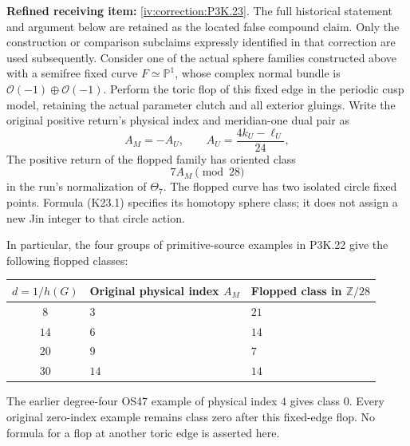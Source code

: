 \begin{theorem}\hypertarget{tag-02U3}{}\label{night:P3K.23}

\par\noindent\textbf{Refined receiving item:} \cref{iv:correction:P3K.23}. The full historical statement and argument below are retained as the located false compound claim. Only the construction or comparison subclaims expressly identified in that correction are used subsequently.
Consider one of the actual sphere families constructed above with a
semifree fixed curve \(F\simeq\mathbb P^1\), whose complex normal bundle
is \(\mathcal O(-1)\oplus\mathcal O(-1)\). Perform the toric flop of
this fixed edge in the periodic cusp model, retaining the actual
parameter clutch and all exterior gluings. Write the original positive
return's physical index and meridian-one dual pair as
\[
             A_M=-A_U,\qquad A_U=\frac{4k_U-\ell_U}{24},
\]
The positive return of the flopped family has oriented class
\[
                         7A_M\pmod {28}                 \tag{K23.1}
\]
in the run's normalization of \(\Theta _7\). The flopped curve has two
isolated circle fixed points. Formula (K23.1) specifies its homotopy
sphere class; it does not assign a new Jin integer to that circle
action.

In particular, the four groups of primitive-source examples in
P3K.22 give the following flopped classes:


\begin{center}\small\begin{tabular}{c l l}\hline
\(d=1/h(G)\) & Original physical index \(A_M\) & Flopped class in \(\mathbb Z/28\) \\
\hline
\(8\) & \(3\) & \(21\) \\
\(14\) & \(6\) & \(14\) \\
\(20\) & \(9\) & \(7\) \\
\(30\) & \(14\) & \(14\) \\
\hline\end{tabular}\end{center}

The earlier degree-four OS47 example of physical index \(4\) gives class
\(0\). Every original zero-index example remains class zero after
this fixed-edge flop. No formula for a flop at another toric edge is
asserted here.
\end{theorem}

